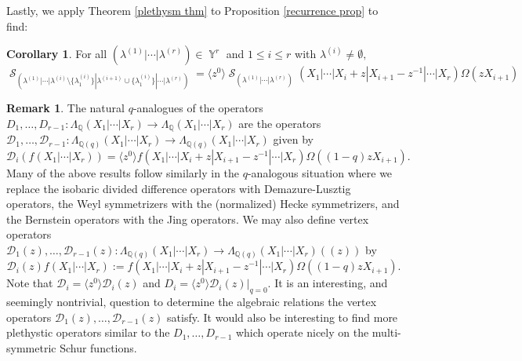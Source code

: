 \documentclass[12pt,reqno]{amsart}
\theoremstyle{definition}
\newtheorem{cor}[thm]{Corollary}
\newtheorem{remark}{Remark}
\DeclareMathOperator{\Par}{\mathbb{Y}}
\DeclareMathOperator{\cS}{\mathcal{S}}
\begin{document}
Lastly, we apply Theorem \ref{plethysm thm} to Proposition \ref{recurrence prop} to find:

\begin{cor}\label{plethysm formula for multi-sym Schurs}
For all $(\lambda^{(1)}|\cdots |\lambda^{(r)}) \in \Par^r$ and $1\leq i \leq r$ with $\lambda^{(i)} \neq \emptyset,$
    $$\cS_{(\lambda^{(1)}|\cdots|\lambda^{(i)}\setminus \{\lambda^{(i)}_{1}\}|\lambda^{(i+1)} \cup \{\lambda^{(i)}_{1}\}|\cdots |\lambda^{(r)})} = \langle z^0 \rangle \cS_{(\lambda^{(1)}|\cdots |\lambda^{(r)})}(X_1|\cdots | X_i+z|X_{i+1}-z^{-1}|\cdots |X_r) \Omega(zX_{i+1}) $$
\end{cor}


\begin{remark}
    The natural $q$-analogues of the operators $D_1,\ldots, D_{r-1}:\Lambda_{\mathbb{Q}}(X_1|\cdots|X_r) \rightarrow \Lambda_{\mathbb{Q}}(X_1|\cdots|X_r)$ are the operators $\mathcal{D}_1,\ldots, \mathcal{D}_{r-1}:\Lambda_{\mathbb{Q}(q)}(X_1|\cdots |X_r) \rightarrow \Lambda_{\mathbb{Q}(q)}(X_1|\cdots |X_r)$ given by 
    $$\mathcal{D}_i(f(X_1|\cdots|X_r))= \langle z^0 \rangle f(X_1|\cdots | X_i+z|X_{i+1}-z^{-1}|\cdots |X_r) \Omega((1-q)zX_{i+1}).$$ Many of the above results follow similarly in the $q$-analogous situation where we replace the isobaric divided difference operators with Demazure-Lusztig operators, the Weyl symmetrizers with the (normalized) Hecke symmetrizers, and the Bernstein operators with the Jing operators. We may also define vertex operators $\mathcal{D}_1(z),\ldots,\mathcal{D}_{r-1}(z) :\Lambda_{\mathbb{Q}(q)}(X_1|\cdots |X_r) \rightarrow \Lambda_{\mathbb{Q}(q)}(X_1|\cdots |X_r)((z))$ by 
    $$\mathcal{D}_i(z)f(X_1|\cdots |X_r) := f(X_1|\cdots | X_i+z|X_{i+1}-z^{-1}|\cdots |X_r) \Omega((1-q)zX_{i+1}).$$ Note that $\mathcal{D}_i = \langle z^0 \rangle \mathcal{D}_i(z)$ and $D_i = \langle z^0 \rangle \mathcal{D}_i(z)|_{q=0}.$ It is an interesting, and seemingly nontrivial, question to determine the algebraic relations the vertex operators $\mathcal{D}_1(z),\ldots,\mathcal{D}_{r-1}(z)$ satisfy. It would also be interesting to find more plethystic operators similar to the $D_1,\ldots,D_{r-1}$ which operate nicely on the multi-symmetric Schur functions.
\end{remark}










\printbibliography
\end{document}
